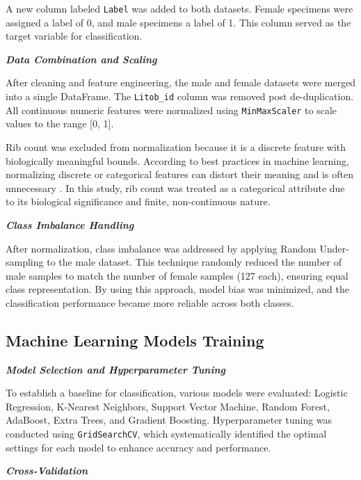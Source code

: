 A new column labeled \texttt{Label} was added to both datasets. Female specimens were assigned a label of 0, and male specimens a label of 1. This column served as the target variable for classification.

\textbf{\textit{Data Combination and Scaling}}

After cleaning and feature engineering, the male and female datasets were merged into a single DataFrame. The \texttt{Litob\_id} column was removed post de-duplication. All continuous numeric features were normalized using \texttt{MinMaxScaler} to scale values to the range [0, 1].

Rib count was excluded from normalization because it is a discrete feature with biologically meaningful bounds. According to best practices in machine learning, normalizing discrete or categorical features can distort their meaning and is often unnecessary \textnormal{\cite{jaiswal2024}}. In this study, rib count was treated as a categorical attribute due to its biological significance and finite, non-continuous nature.

\textbf{\textit{Class Imbalance Handling}}

After normalization, class imbalance was addressed by applying Random Under-sampling to the male dataset. This technique randomly reduced the number of male samples to match the number of female samples (127 each), ensuring equal class representation. By using this approach, model bias was minimized, and the classification performance became more reliable across both classes.

\vspace{0.5cm}
\begin{minipage}{\linewidth}
	\subsection{Machine Learning Models Training}
\end{minipage}

\textbf{\textit{Model Selection and Hyperparameter Tuning}}

To establish a baseline for classification, various models were evaluated: Logistic Regression, K-Nearest Neighbors, Support Vector Machine, Random Forest, AdaBoost, Extra Trees, and Gradient Boosting. Hyperparameter tuning was conducted using \texttt{GridSearchCV}, which systematically identified the optimal settings for each model to enhance accuracy and performance.

\newpage
\textbf{\textit{Cross-Validation}}

